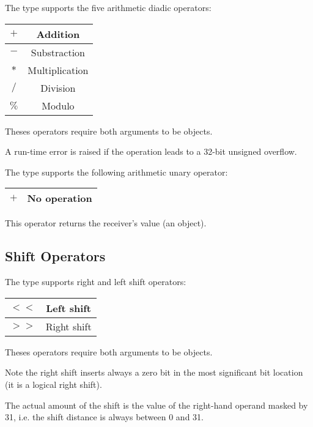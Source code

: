 The  type supports the five arithmetic diadic operators:\newline

\begin{tabular}{|c|c|}
\hline
$+$ & Addition \\
\hline
$-$ & Substraction \\
\hline
$*$ & Multiplication \\
\hline
$/$ & Division \\
\hline
$\%$ & Modulo \\
\hline
\end{tabular}

Theses operators require both arguments to be  objects.\newline

A run-time error is raised if the operation leads to a 32-bit unsigned overflow.

The  type supports the following arithmetic unary operator:\newline

\begin{tabular}{|c|c|}
\hline
$+$ & No operation \\
\hline
\end{tabular}

This operator returns the receiver's value (an   object).






\subsection{Shift Operators}


The  type supports right and left shift operators:\newline

\begin{tabular}{|c|c|}
\hline
$<<$ & Left shift \\
\hline
$>>$ & Right shift \\
\hline
\end{tabular}

Theses operators require both arguments to be  objects.\newline

Note the right shift inserts always a zero bit in the most significant bit location (it is a logical right shift).\newline

The actual amount of the shift is the value of the right-hand operand masked by 31, i.e. the shift distance is always between 0 and 31.




